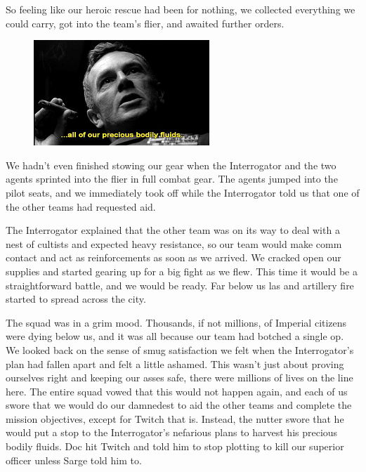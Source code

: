 So feeling like our heroic rescue had been for nothing, we collected everything we could carry, got into the team’s flier, and awaited further orders.

\begin{figure}
	\begin{center}
		\includegraphics[width=\figwidth]{pics/5/18.png}
	\end{center}
\end{figure}
We hadn’t even finished stowing our gear when the Interrogator and the two agents sprinted into the flier in full combat gear. 
The agents jumped into the pilot seats, and we immediately took off while the Interrogator told us that one of the other teams had requested aid. 

The Interrogator explained that the other team was on its way to deal with a nest of cultists and expected heavy resistance, so our team would make comm contact and act as reinforcements as soon as we arrived. 
We cracked open our supplies and started gearing up for a big fight as we flew. This time it would be a straightforward battle, and we would be ready. 
Far below us las and artillery fire started to spread across the city.

The squad was in a grim mood. 
Thousands, if not millions, of Imperial citizens were dying below us, and it was all because our team had botched a single op. 
We looked back on the sense of smug satisfaction we felt when the Interrogator’s plan had fallen apart and felt a little ashamed. 
This wasn’t just about proving ourselves right and keeping our asses safe, there were millions of lives on the line here. 
The entire squad vowed that this would not happen again, and each of us swore that we would do our damnedest to aid the other teams and complete the mission objectives, except for Twitch that is. %
Instead, the nutter swore that he would put a stop to the Interrogator’s nefarious plans to harvest his precious bodily fluids. 
Doc hit Twitch and told him to stop plotting to kill our superior officer unless Sarge told him to.


